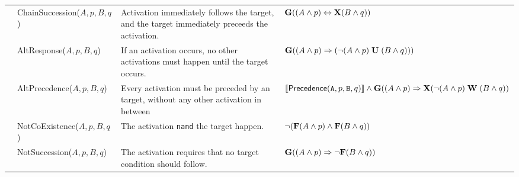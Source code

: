 \begin{table}[!t]
{\begin{tabular}{c|l|p{9cm}|l}
	 & \textsf{ChainSuccession($A,p,B,q$) }  & Activation immediately follows the target, and the target immediately preceeds the activation. & $\mathbf{G}((A\wedge p)\Leftrightarrow\mathbf{X}(B\wedge q))$\\
	 & \textsf{AltResponse($A,p,B,q$) }  & If an activation occurs, no other activations must happen until the target occurs.  & $\mathbf{G}((A\wedge p)\Rightarrow({\neg(A\wedge p)}\;\mathbf{U}\;{(B\wedge q)}))$\\
	 & \textsf{AltPrecedence($A,p,B,q$) }  & Every activation must be preceded by an target, without any other
	 activation in between &   $\llbracket\textsf{Precedence}(\texttt{A},p,\texttt{B},q)\rrbracket\wedge \mathbf{G}((A\wedge p)\Rightarrow \mathbf{X}({\neg(A\wedge p)}\;\mathbf{W}\;{(B\wedge q)})$\\
	 \midrule
	 
	 \parbox[t]{2mm}{} & \textsf{NotCoExistence($A,p,B,q$) } & The activation \texttt{nand} the target happen.&  $\neg(\mathbf{F}(A\wedge p)\wedge\mathbf{F}(B\wedge q))$\\
	 & \textsf{NotSuccession($A,p,B,q$)} & The activation requires that no target condition should follow.& $\mathbf{G}((A\wedge p)\Rightarrow \neg\mathbf{F}(B\wedge q))$ \\
	 \bottomrule
\end{tabular}}
\end{table} 


